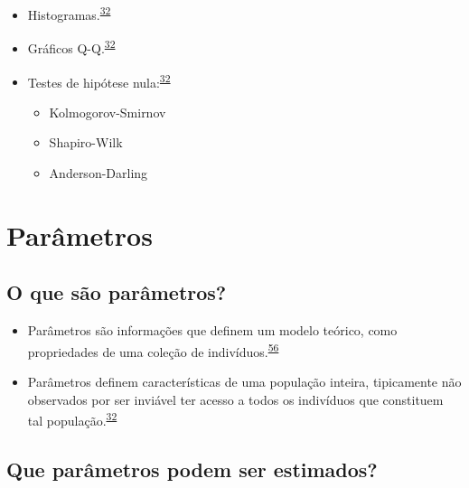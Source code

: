 \documentclass[
  a4paper,
]{book}
\begin{document}
\begin{itemize}
\item
  Histogramas.\textsuperscript{\protect\hyperlink{ref-vetter2017}{32}}
\item
  Gráficos Q-Q.\textsuperscript{\protect\hyperlink{ref-vetter2017}{32}}
\item
  Testes de hipótese nula:\textsuperscript{\protect\hyperlink{ref-vetter2017}{32}}

  \begin{itemize}
  \item
    Kolmogorov-Smirnov
  \item
    Shapiro-Wilk
  \item
    Anderson-Darling
  \end{itemize}
\end{itemize}

\hypertarget{parametros}{%
\section{Parâmetros}\label{parametros}}

\hypertarget{o-que-suxe3o-paruxe2metros}{%
\subsection{O que são parâmetros?}\label{o-que-suxe3o-paruxe2metros}}

\begin{itemize}
\item
  Parâmetros são informações que definem um modelo teórico, como propriedades de uma coleção de indivíduos.\textsuperscript{\protect\hyperlink{ref-Altman1999}{56}}
\item
  Parâmetros definem características de uma população inteira, tipicamente não observados por ser inviável ter acesso a todos os indivíduos que constituem tal população.\textsuperscript{\protect\hyperlink{ref-vetter2017}{32}}
\end{itemize}

\hypertarget{que-paruxe2metros-podem-ser-estimados}{%
\subsection{Que parâmetros podem ser estimados?}\label{que-paruxe2metros-podem-ser-estimados}}
\end{document}
